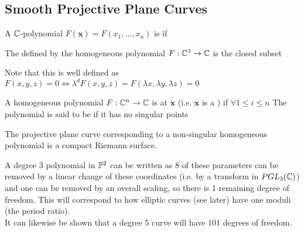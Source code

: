 \documentclass{article}
\begin{document}
\subsection{Smooth Projective Plane Curves}

\begin{definition}
	A $\mathbb{C}$-polynomial $F(\bm{x})=F(x_1, \dots, x_n)$ is  if 
\end{definition}

\begin{definition}
	The  defined by the homogeneous polynomial $F:\mathbb{C}^3 \to \mathbb{C}$ is the closed subset
\end{definition}

\begin{remark}
	Note that this is well defined as $F(x,y,z) = 0 \Leftrightarrow \lambda^d F(x,y,z)=F(\lambda x, \lambda y, \lambda z)=0$
\end{remark}

\begin{definition}
	A homogeneous polynomial $F:\mathbb{C}^n \to \mathbb{C}$ is  at $\bm{x}$ (i.e. $\bm{x}$ is a ) if $\forall 1 \leq i \leq n$
	The polynomial is said to be  if it has no singular points
\end{definition}

\begin{prop}
	The projective plane curve corresponding to a non-singular homogeneous polynomial is a compact Riemann surface. 
\end{prop}

\begin{remark}
	A degree $3$ polynomial in $\mathbb{P}^2$ can be written as 
$8$ of these parameters can be removed by a linear change of these coordinates (i.e. by a transform in $PGL_3(\mathbb{C})$) and one can be removed by an overall scaling, so there is 1 remaining degree of freedom. This will correspond to how elliptic curves (see later) have one moduli (the period ratio). \\
It can likewise be shown that a degree $5$ curve will have $101$ degrees of freedom. 
\end{remark}

\end{document}
